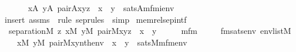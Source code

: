 \begin{isabellebody}
\ \ \isanewline
\ \ \ \ {\isachardoublequoteopen}{\isacharparenleft}{\kern0pt}{\isasymexists}x{\isasymin}A{\isachardot}{\kern0pt}\ {\isasymexists}y{\isasymin}A{\isachardot}{\kern0pt}\ pair{\isacharparenleft}{\kern0pt}{\isacharhash}{\kern0pt}{\isacharhash}{\kern0pt}A{\isacharcomma}{\kern0pt}x{\isacharcomma}{\kern0pt}y{\isacharcomma}{\kern0pt}z{\isacharparenright}{\kern0pt}\ {\isacharampersand}{\kern0pt}\ x\ {\isasymin}\ y{\isacharparenright}{\kern0pt}\ {\isasymlongleftrightarrow}\ sats{\isacharparenleft}{\kern0pt}A{\isacharcomma}{\kern0pt}{\isacharquery}{\kern0pt}mfm{\isacharparenleft}{\kern0pt}i{\isacharparenright}{\kern0pt}{\isacharcomma}{\kern0pt}env{\isacharparenright}{\kern0pt}{\isachardoublequoteclose}\isanewline
%
\isadelimproof
\ \ %
\endisadelimproof
%
\isatagproof
{}\isamarkupfalse%
\ {\isacharparenleft}{\kern0pt}insert\ assms\ {\isacharsemicolon}{\kern0pt}\ {\isacharparenleft}{\kern0pt}rule\ sep{\isacharunderscore}{\kern0pt}rules\ {\isacharbar}{\kern0pt}\ simp{\isacharparenright}{\kern0pt}{\isacharplus}{\kern0pt}{\isacharparenright}{\kern0pt}%
\endisatagproof
{\isafoldproof}%
%
\isadelimproof
\isanewline
%
\endisadelimproof
\isanewline
{}\isamarkupfalse%
\ memrel{\isacharunderscore}{\kern0pt}sep{\isacharunderscore}{\kern0pt}intf{\isacharcolon}{\kern0pt}\isanewline
\ \ {\isachardoublequoteopen}separation{\isacharparenleft}{\kern0pt}{\isacharhash}{\kern0pt}{\isacharhash}{\kern0pt}M{\isacharcomma}{\kern0pt}\ {\isasymlambda}z{\isachardot}{\kern0pt}\ {\isasymexists}x{\isasymin}M{\isachardot}{\kern0pt}\ {\isasymexists}y{\isasymin}M{\isachardot}{\kern0pt}\ pair{\isacharparenleft}{\kern0pt}{\isacharhash}{\kern0pt}{\isacharhash}{\kern0pt}M{\isacharcomma}{\kern0pt}x{\isacharcomma}{\kern0pt}y{\isacharcomma}{\kern0pt}z{\isacharparenright}{\kern0pt}\ {\isacharampersand}{\kern0pt}\ x\ {\isasymin}\ y{\isacharparenright}{\kern0pt}{\isachardoublequoteclose}\isanewline
%
\isadelimproof
%
\endisadelimproof
%
\isatagproof
{}\isamarkupfalse%
\ {\isacharminus}{\kern0pt}\isanewline
\ \ \isamarkupfalse%
\ mfm\ \isanewline
\ \ \ \ fmsats{\isacharcolon}{\kern0pt}{\isachardoublequoteopen}{\isasymAnd}env{\isachardot}{\kern0pt}\ env{\isasymin}list{\isacharparenleft}{\kern0pt}M{\isacharparenright}{\kern0pt}\ {\isasymLongrightarrow}\isanewline
\ \ \ \ {\isacharparenleft}{\kern0pt}{\isasymexists}x{\isasymin}M{\isachardot}{\kern0pt}\ {\isasymexists}y{\isasymin}M{\isachardot}{\kern0pt}\ pair{\isacharparenleft}{\kern0pt}{\isacharhash}{\kern0pt}{\isacharhash}{\kern0pt}M{\isacharcomma}{\kern0pt}x{\isacharcomma}{\kern0pt}y{\isacharcomma}{\kern0pt}nth{\isacharparenleft}{\kern0pt}{}{\isacharcomma}{\kern0pt}env{\isacharparenright}{\kern0pt}{\isacharparenright}{\kern0pt}\ {\isacharampersand}{\kern0pt}\ x\ {\isasymin}\ y{\isacharparenright}{\kern0pt}\ {\isasymlongleftrightarrow}\ sats{\isacharparenleft}{\kern0pt}M{\isacharcomma}{\kern0pt}mfm{\isacharparenleft}{\kern0pt}{}{\isacharparenright}{\kern0pt}{\isacharcomma}{\kern0pt}env{\isacharparenright}{\kern0pt}{\isachardoublequoteclose}\isanewline

\end{isabellebody}
